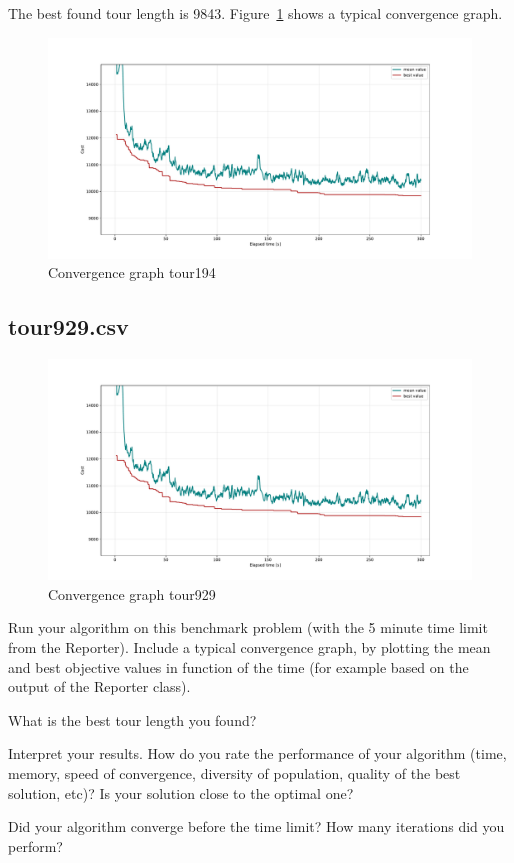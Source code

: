 \documentclass[a4paper,10pt]{article}
\newcommand{\ReplaceMe}[1]{{\color{blue}#1}}
\begin{document}

The best found tour length is 9843. Figure~\ref{fig:convergence194} shows a typical convergence graph. 
\begin{figure}[H]
  \centering
  \includegraphics[width=.8\linewidth]{img/convergence194.pdf}
  \caption{Convergence graph tour194}
  \label{fig:convergence194}
\end{figure}

\subsection{tour929.csv}
\begin{figure}[H]
  \centering
  \includegraphics[width=.8\linewidth]{img/convergence194.pdf}
  \caption{Convergence graph tour929}
  \label{fig:convergence929}
\end{figure}

\ReplaceMe{Run your algorithm on this benchmark problem (with the 5 minute time limit from the Reporter). Include a typical convergence graph, by plotting the mean and best objective values in function of the time (for example based on the output of the Reporter class). 

What is the best tour length you found? 

Interpret your results. How do you rate the performance of your algorithm (time, memory, speed of convergence, diversity of population, quality of the best solution, etc)? Is your solution close to the optimal one? 

Did your algorithm converge before the time limit? How many iterations did you perform?}
\end{document}
